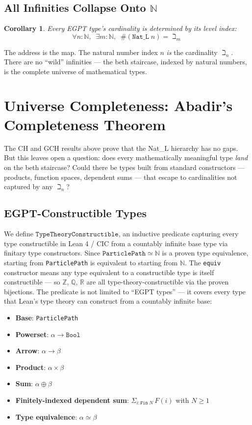 \documentclass{report}
\newtheorem{corollary}{Corollary}
\begin{document}
\subsection{All Infinities Collapse Onto $\mathbb{N}$}

\begin{corollary}
Every EGPT type's cardinality is determined by its level index:
$$\forall n : \mathbb{N},\;\; \exists m : \mathbb{N},\;\; \#(\texttt{Nat\_L}\; n) = \beth_m$$
\end{corollary}

The address is the map. The natural number index $n$ \textit{is} the cardinality
$\beth_n$. There are no ``wild'' infinities --- the beth staircase, indexed by
natural numbers, is the complete universe of mathematical types.

\section{Universe Completeness: Abadir's Completeness Theorem}

The CH and GCH results above prove that the Nat\_L hierarchy has no gaps.
But this leaves open a question: does every mathematically meaningful type
\emph{land} on the beth staircase? Could there be types built from standard
constructors --- products, function spaces, dependent sums --- that escape to
cardinalities not captured by any $\beth_n$?

\subsection{EGPT-Constructible Types}

We define $\texttt{TypeTheoryConstructible}$, an inductive predicate capturing
every type constructible in Lean 4 / CIC from a countably infinite base
type via finitary type constructors. Since $\texttt{ParticlePath} \simeq
\mathbb{N}$ is a proven type equivalence, starting from \texttt{ParticlePath}
is equivalent to starting from $\mathbb{N}$. The \texttt{equiv} constructor
means any type equivalent to a constructible type is itself constructible ---
so $\mathbb{Z}$, $\mathbb{Q}$, $\mathbb{R}$ are all type-theory-constructible via
the proven bijections. The predicate is not limited to ``EGPT types'' --- it
covers every type that Lean's type theory can construct from a countably
infinite base:

\begin{itemize}
\item \textbf{Base}: \texttt{ParticlePath}
\item \textbf{Powerset}: $\alpha \to \texttt{Bool}$
\item \textbf{Arrow}: $\alpha \to \beta$
\item \textbf{Product}: $\alpha \times \beta$
\item \textbf{Sum}: $\alpha \oplus \beta$
\item \textbf{Finitely-indexed dependent sum}: $\Sigma_{i : \texttt{Fin}\; N}\, F(i)$ with $N \geq 1$
\item \textbf{Type equivalence}: $\alpha \simeq \beta$
\end{itemize}
\end{document}
